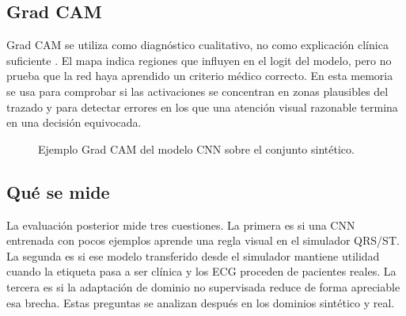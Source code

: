 \subsection{Grad CAM}

Grad CAM se utiliza como diagnóstico cualitativo, no como explicación clínica suficiente \cite{selvaraju2017}. El mapa indica regiones que influyen en el logit del modelo, pero no prueba que la red haya aprendido un criterio médico correcto. En esta memoria se usa para comprobar si las activaciones se concentran en zonas plausibles del trazado y para detectar errores en los que una atención visual razonable termina en una decisión equivocada.

\begin{figure}[H]
  \centering
  \caption{Ejemplo Grad CAM del modelo CNN sobre el conjunto sintético.}
  \label{fig:gradcam_sintetico_modelos}
\end{figure}

\subsection{Qué se mide}

La evaluación posterior mide tres cuestiones. La primera es si una CNN entrenada con pocos ejemplos aprende una regla visual en el simulador QRS/ST. La segunda es si ese modelo transferido desde el simulador mantiene utilidad cuando la etiqueta pasa a ser clínica y los ECG proceden de pacientes reales. La tercera es si la adaptación de dominio no supervisada reduce de forma apreciable esa brecha. Estas preguntas se analizan después en los dominios sintético y real.
